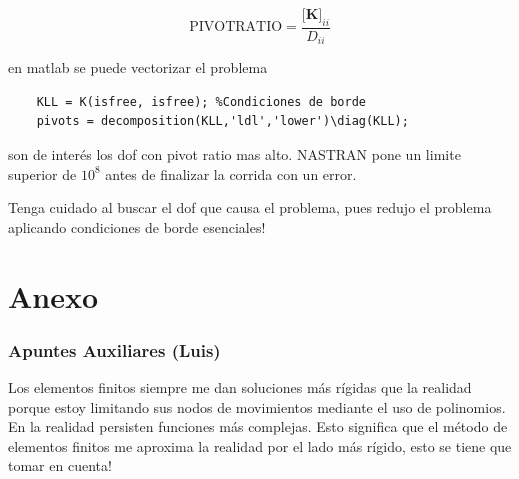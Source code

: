 \documentclass[11pt, a4paper,titlepage]{article}
\newcommand{\Mme}[1]{\boldsymbol{[}\mathbf{#1} \boldsymbol{]}}
\newcommand{\MK}{\Mme{K}}
\let\oldpart\part
\renewcommand{\part}[1]{\clearpage \oldpart{#1}}
\begin{document}
\[
\text{PIVOTRATIO} = \frac{\MK_{ii}}{D_{ii}}
\]

en matlab se puede vectorizar el problema
\begin{verbatim}
    KLL = K(isfree, isfree); %Condiciones de borde
    pivots = decomposition(KLL,'ldl','lower')\diag(KLL);
\end{verbatim}
son de interés los dof con pivot ratio mas alto. NASTRAN pone un limite superior de $10^8$ antes de finalizar la corrida con un error.

Tenga cuidado al buscar el dof que causa el problema, pues redujo el problema aplicando condiciones de borde esenciales! 



\part{Anexo}

\section*{Apuntes Auxiliares (Luis)}
Los elementos finitos siempre me dan soluciones más rígidas que la realidad porque estoy limitando sus nodos de movimientos mediante el uso de polinomios. En la realidad persisten funciones más complejas. Esto significa que el método de elementos finitos me aproxima la realidad por el lado más rígido, esto se tiene que tomar en cuenta!
\end{document}
